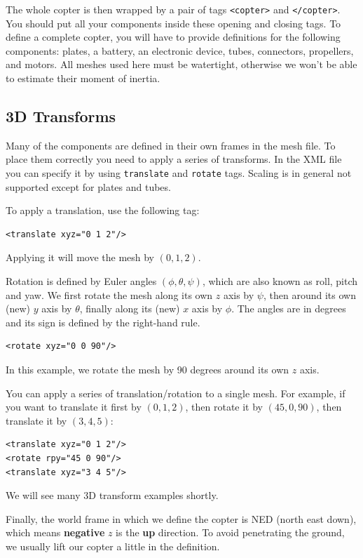 The whole copter is then wrapped by a pair of tags \texttt{<copter>} and \texttt{</copter>}. You should put all your components inside these opening and closing tags. To define a complete copter, you will have to provide definitions for the following components: plates, a battery, an electronic device, tubes, connectors, propellers, and motors. All meshes used here must be watertight, otherwise we won't be able to estimate their moment of inertia.

\subsection{3D Transforms}
Many of the components are defined in their own frames in the mesh file. To place them correctly you need to apply a series of transforms. In the XML file you can specify it by using \texttt{translate} and \texttt{rotate} tags. Scaling is in general not supported except for plates and tubes.

To apply a translation, use the following tag:
\begin{verbatim}
<translate xyz="0 1 2"/>
\end{verbatim}
Applying it will move the mesh by $(0,1,2)$.

Rotation is defined by Euler angles $(\phi,\theta,\psi)$, which are also known as roll, pitch and yaw. We first rotate the mesh along its own $z$ axis by $\psi$, then around its own (new) $y$ axis by $\theta$, finally along its (new) $x$ axis by $\phi$. The angles are in degrees and its sign is defined by the right-hand rule.
\begin{verbatim}
<rotate xyz="0 0 90"/>
\end{verbatim}
In this example, we rotate the mesh by 90 degrees around its own $z$ axis.

You can apply a series of translation/rotation to a single mesh. For example, if you want to translate it first by $(0, 1, 2)$, then rotate it by $(45, 0, 90)$, then translate it by $(3, 4, 5)$:
\begin{verbatim}
<translate xyz="0 1 2"/>
<rotate rpy="45 0 90"/>
<translate xyz="3 4 5"/>
\end{verbatim}

We will see many 3D transform examples shortly.

Finally, the world frame in which we define the copter is NED (north east down), which means \textbf{negative} $z$ is the \textbf{up} direction. To avoid penetrating the ground, we usually lift our copter a little in the definition.

